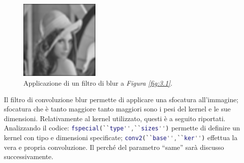 \documentclass{subfiles}
\begin{document}
\begin{figure}
    \centering
    \includegraphics[width = 0.35\textwidth]{../../Figure/Other/Lena/Convolution of Lena with average kernel 21x21.png}
    \caption{Applicazione di un filtro di blur a \emph{Figura \ref{fig:3.1}}.}
    \label{fig:3.2}
\end{figure}
Il filtro di convoluzione blur permette di applicare una sfocatura all'immagine;
sfocatura che è tanto maggiore tanto maggiori sono i pesi del kernel e le sue dimensioni.
Relativamente al kernel utilizzato, questi è a seguito riportati.
\noindent
Analizzando il codice: \lstinline[language = MATLAB]{fspecial(``type'',``sizes'')} permette di definire un kernel con tipo e dimensioni specificate;
\lstinline[language = MATLAB]{conv2(``base'',``ker'')} effettua la vera e propria convoluzione.  Il perché del parametro ``same'' sarà discusso successivamente.
\end{document}
